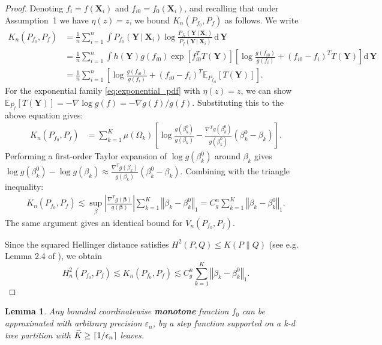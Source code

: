 \documentclass[12pt]{article}
\newcommand{\bm}[1]{\boldsymbol{#1}}
\renewcommand{\d}{\mathrm{d}}
\newcommand{\Y}{\bm{Y}}
\newcommand{\norm}[1]{\left\Vert#1\right\Vert}
\newcommand{\abs}[1]{\left\vert#1\right\vert}
\newcommand{\1}{\mathbb{I}}
\newcommand{\wh}[1]{\smash{\widehat{#1}}}
\def\C {\,|\:}
\def\C {\,|\:}
\def\b{\bm{\beta}}
\def\Y{\bm{Y}}
\def\X{\bm{X}}
\def\b{\bm{\beta}}
\renewcommand{\d}{\mathrm{d}\,}
\renewcommand{\d}{\mathrm{d}}
\def\C{\mbox{\boldmath$C$}}
\def\b{\mbox{\boldmath$b$}}
\def\d{\mbox{\boldmath$d$}}
\def\X{\mbox{\boldmath$X$}}
\renewcommand{\Y}{\bm{Y}}
\def\C {\,|\:}
\def\C {\,|\:}
\def\b{\bm{\beta}}
\def\X{\bm{X}}
\def\b{\bm{\beta}}
\renewcommand{\d}{\mathrm{d}\,}
\theoremstyle{plain}
\newtheorem{lemma}[theorem]{Lemma}
\theoremstyle{definition}
\theoremstyle{remark}
\begin{document}
\begin{proof}
Denoting $f_i=f(\X_i)$ and $f_{i0}=f_0(\X_i)$, and recalling that under Assumption~1 we have $\eta(z)=z$, we bound $K_n(P_{f_0}, P_f)$ as follows. We write
\begin{align*}
K_n(P_{f_0},P_f)
&= \frac{1}{n}\sum_{i=1}^n \int P_{f_0}(\Y \C \X_i)\log\frac{P_{f_0}(\Y \C \X_i)}{P_f(\Y \C \X_i)}\,\d\Y \\
&= \frac{1}{n}\sum_{i=1}^n \int h(\Y)g(f_{i0})\exp\!\left[f_{i0}^T T(\Y)\right]
   \!\left[\log\frac{g(f_{i0})}{g(f_i)} + (f_{i0}-f_i)^T T(\Y)\right]\d\Y \\
&= \frac{1}{n}\sum_{i=1}^n \!\left[\log\frac{g(f_{i0})}{g(f_i)}
   + (f_{i0}-f_i)^T \mathbb{E}_{P_{f_{i0}}}\!\left[T(\Y)\right]\right].
\end{align*}
For the exponential family \eqref{eq:exponential_pdf} with $\eta(z)=z$, we can show %
$\mathbb{E}_{P_f}[T(\Y)] = -\nabla \log g(f) = -\nabla g(f)/g(f)$. Substituting this to the above equation gives:
\begin{align*}
K_n(P_{f_0},P_f)
&= \sum_{k=1}^K \mu(\Omega_k)
   \!\left[\log\frac{g(\beta^0_k)}{g(\beta_k)}
   - \frac{\nabla^T g(\beta^0_k)}{g(\beta^0_k)}(\beta^0_k-\beta_k)\right].
\end{align*}
Performing a first-order Taylor expansion of $\log g(\beta^0_k)$ around $\beta_k$ gives $\log g(\beta^0_k) - \log g(\beta_k) \approx \frac{\nabla^T g(\beta_k)}{g(\beta_k)}(\beta^0_k - \beta_k)$. Combining with the triangle inequality:
\begin{align*}
K_n(P_{f_0},P_f) \lesssim \sup_\beta \abs{\frac{\nabla^T g(\b)}{g(\b)}}\sum_{k=1}^K\norm{\beta_k-\beta^0_k}_1
 = C^n_g \sum_{k=1}^K\norm{\beta_k-\beta^0_k}_1.
\end{align*}
The same argument gives an identical bound for $V_n(P_{f_0},P_f)$.

Since the squared Hellinger distance satisfies $H^2(P,Q) \le K(P\|Q)$ (see e.g. Lemma 2.4 of \cite{tsybakov2009introduction}), we obtain
\begin{equation*}
H_n^2(P_{f_0}, P_f) \lesssim K_n(P_{f_0},P_f) \lesssim C^n_g \sum_{k=1}^K \norm{\beta_k-\beta^0_k}_1.
\end{equation*}
\end{proof}

\iffalse
\begin{lemma}
Any bounded coordinatewise {\bf monotone} function $f_0$ can be approximated with arbitrary precision $\varepsilon_n$, by a step function supported on a k-d tree partition with $\wh{K} \ge \lceil 1/\epsilon_n \rceil$ leaves.
\end{lemma}
\end{document}
